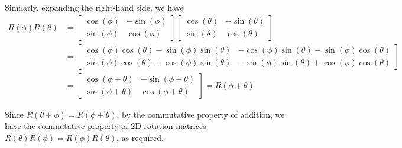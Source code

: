 Similarly, expanding the right-hand side, we have
\begin{align*}
    R(\phi)R(\theta)
     & =
    \begin{bmatrix}
        \cos(\phi) & -\sin(\phi) \\
        \sin(\phi) & \cos(\phi)
    \end{bmatrix}
    \begin{bmatrix}
        \cos(\theta) & -\sin(\theta) \\
        \sin(\theta) & \cos(\theta)
    \end{bmatrix}
    \\ & =
    \begin{bmatrix}
        \cos(\phi)\cos(\theta) - \sin(\phi)\sin(\theta) & -\cos(\phi)\sin(\theta) - \sin(\phi)\cos(\theta) \\
        \sin(\phi)\cos(\theta) + \cos(\phi)\sin(\theta) & -\sin(\phi)\sin(\theta) + \cos(\phi)\cos(\theta)
    \end{bmatrix}
    \\ & =
    \begin{bmatrix}
        \cos(\phi + \theta) & -\sin(\phi + \theta) \\
        \sin(\phi + \theta) & \cos(\phi + \theta)
    \end{bmatrix}
    =
    R(\phi + \theta)
\end{align*}

Since \( R(\theta + \phi) = R(\phi + \theta) \), by the commutative property of addition, we have the commutative property of 2D rotation matrices \( R(\theta)R(\phi) = R(\phi)R(\theta) \), as required.
